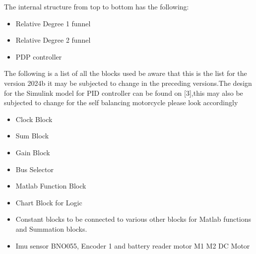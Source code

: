 \documentclass{article}
\begin{document}
The internal structure from top to bottom has the following:\\

\begin{itemize}
    \item Relative Degree 1 funnel 
    \item Relative Degree 2 funnel 
    \item PDP controller 
\end{itemize}

The following is a list of all the blocks used be aware that this is the list for the version 2024b it may be subjected to change in the preceding versions.The design for the Simulink model for PID controller can be found on [3],this may also be subjected to change for the self balancing motorcycle please look accordingly\\

\begin{itemize}
    \item Clock Block 
    \item Sum Block 
    \item Gain Block
    \item Bus Selector
    \item Matlab Function Block
    \item Chart Block for Logic 
    \item Constant blocks to be connected to various other blocks for Matlab functions and Summation blocks.
    \item Imu sensor BNO055, Encoder 1 and battery reader motor M1 M2 DC Motor 
\end{itemize}

\end{document}
